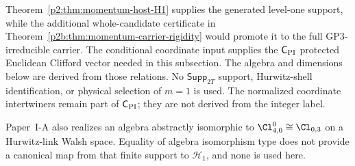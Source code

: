\documentclass[11pt,a4paper]{article}
\begin{document}
\begin{remark}
\label{p2:rem:series-selected-minimal-imports}
Theorem~\ref{p2:thm:momentum-host-H1} supplies the generated level-one
support, while the additional whole-candidate certificate in
Theorem~\ref{p2b:thm:momentum-carrier-rigidity} would promote it to the
full GP3-irreducible carrier.  The conditional coordinate input supplies the
\(\mathsf C_{\rm PI}\) protected Euclidean Clifford vector needed in this
subsection.  The algebra and
dimensions below are derived from those relations.  No
\(\mathsf{Supp}_{2T}\) support, Hurwitz-shell identification, or physical
selection of \(m=1\) is used.  The normalized coordinate intertwiners remain
part of \(\mathsf C_{\rm PI}\); they are not derived from the integer label.
\end{remark}

\begin{remark}
\label{p2:rem:hurwitz-link-structural-carrier}
Paper~I-A also realizes an algebra abstractly isomorphic to
\(\Cl^0_{4,0}\cong\Cl_{0,3}\) on a Hurwitz-link Walsh space.  Equality of
algebra isomorphism type does not provide a canonical map from that finite
support to \(\mathcal H_1\), and none is used here.
\end{remark}
\end{document}
